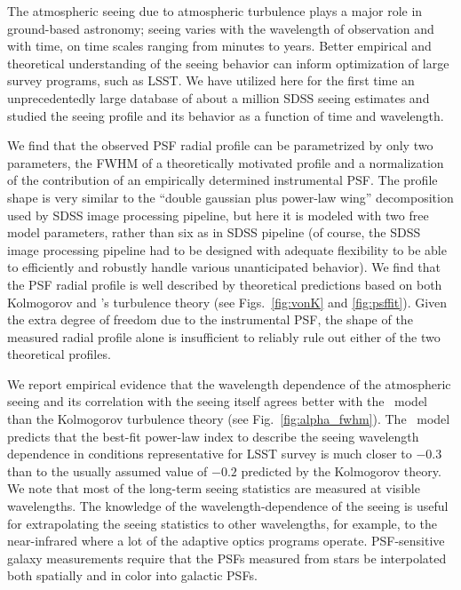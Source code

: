 
 
The atmospheric seeing due to atmospheric turbulence plays a major role in 
ground-based astronomy; seeing varies with the wavelength of observation
and with time, on time scales ranging from minutes to years. Better empirical
and theoretical understanding of the seeing behavior can inform optimization 
of large survey programs, such as LSST. We have utilized here for the first 
time an unprecedentedly large database of about a million SDSS seeing estimates
and studied the seeing profile and its behavior as a function of time and wavelength.

We find that the observed PSF radial profile can be parametrized by only two parameters, 
the FWHM of a theoretically motivated profile and a normalization of the contribution 
of an empirically determined instrumental PSF. The profile shape is very similar to 
the ``double gaussian plus power-law wing'' decomposition used by SDSS image
processing pipeline, but here it is modeled with two free model parameters, rather 
than six as in SDSS pipeline (of course, the SDSS image processing pipeline had
to be designed with adequate flexibility to be able to efficiently and robustly 
handle various unanticipated behavior). We find that the PSF radial profile is well 
described by theoretical predictions based on both 
Kolmogorov and \vk's turbulence theory (see Figs.~\ref{fig:vonK} and \ref{fig:psffit}). 
Given the extra degree of freedom due to the instrumental PSF, the shape of the
measured radial profile alone 
is insufficient to reliably rule out either of the two theoretical profiles.  

We report empirical evidence that the wavelength dependence of the atmospheric 
seeing and its correlation with the seeing itself agrees better with the \vk~model 
than the Kolmogorov turbulence theory (see
Fig.~\ref{fig:alpha_fwhm}). The \vk~model predicts that 
the best-fit power-law index to describe the seeing wavelength dependence in conditions 
representative for LSST survey is much closer to $-0.3$ than to the usually assumed value
of $-0.2$ predicted by the Kolmogorov theory. 
We note that most of the long-term seeing statistics are measured at visible 
wavelengths. The knowledge of the wavelength-dependence of the seeing is useful 
for extrapolating the seeing statistics to other wavelengths, for example, to
the near-infrared where a lot of the adaptive optics programs operate. 
PSF-sensitive galaxy measurements require that the PSFs measured from
stars be interpolated both spatially and in color into galactic PSFs.


